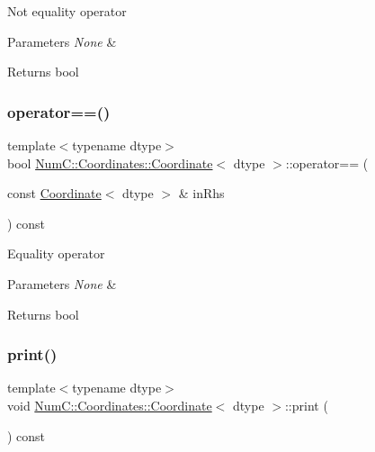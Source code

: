 Not equality operator


\begin{DoxyParams}{Parameters}
{\em None} & \\
\hline
\end{DoxyParams}
\begin{DoxyReturn}{Returns}
bool 
\end{DoxyReturn}
\mbox{\label{class_num_c_1_1_coordinates_1_1_coordinate_a8cb8145a08a9274ef06224dcac937fe8}} 
\subsubsection{\texorpdfstring{operator==()}{operator==()}}
{\footnotesize\ttfamily template$<$typename dtype$>$ \\
bool \mbox{\hyperlink{class_num_c_1_1_coordinates_1_1_coordinate}{Num\+C\+::\+Coordinates\+::\+Coordinate}}$<$ dtype $>$\+::operator== (\begin{DoxyParamCaption}\item[{const \mbox{\hyperlink{class_num_c_1_1_coordinates_1_1_coordinate}{Coordinate}}$<$ dtype $>$ \&}]{in\+Rhs }\end{DoxyParamCaption}) const\hspace{0.3cm}{\ttfamily [inline]}}

Equality operator


\begin{DoxyParams}{Parameters}
{\em None} & \\
\hline
\end{DoxyParams}
\begin{DoxyReturn}{Returns}
bool 
\end{DoxyReturn}
\mbox{\label{class_num_c_1_1_coordinates_1_1_coordinate_aa0f224ac4f39b97e7f424aaa78d2a6ef}} 
\subsubsection{\texorpdfstring{print()}{print()}}
{\footnotesize\ttfamily template$<$typename dtype$>$ \\
void \mbox{\hyperlink{class_num_c_1_1_coordinates_1_1_coordinate}{Num\+C\+::\+Coordinates\+::\+Coordinate}}$<$ dtype $>$\+::print (\begin{DoxyParamCaption}{ }\end{DoxyParamCaption}) const\hspace{0.3cm}{\ttfamily [inline]}}

